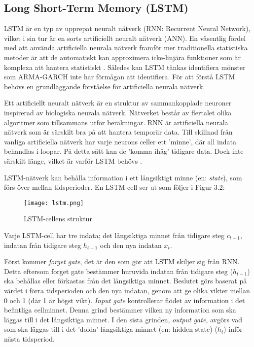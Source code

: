 \documentclass[11pt]{article}
\numberwithin{equation}{section}
\numberwithin{table}{section}
\numberwithin{figure}{section}
\begin{document}
\subsection{Long Short-Term Memory (LSTM)}
LSTM är en typ av upprepat neuralt nätverk (RNN: Recurrent Neural Network), vilket i sin tur är en sorts artificiellt neuralt nätverk (ANN). En väsentlig fördel med att använda artificiella neurala nätverk framför mer traditionella statistiska metoder är att de automatiskt kan approximera icke-linjära funktioner som är komplexa att hantera statistiskt \parencite{paliwal2009neural}. Således kan LSTM tänkas identifiera mönster som ARMA-GARCH inte har förmågan att identifiera.  För att förstå LSTM behövs en grundläggande förståelse för artificiella neurala nätverk. 

Ett artificiellt neuralt nätverk är en struktur av sammankopplade neuroner inspirerad av biologiska neurala nätverk. Nätverket består av flertalet olika algoritmer som tillsammans utför beräkningar. RNN är artificiella neurala nätverk som är särskilt bra på att hantera temporär data. Till skillnad från vanliga artificiella nätverk har varje neurons celler ett 'minne', där all indata behandlas i loopar. På detta sätt kan de 'komma ihåg' tidigare data. Dock inte särskilt länge, vilket är varför LSTM behövs \parencite[][,s.478-559]{purkait2019hands}. 

LSTM-nätverk kan behålla information i ett långsiktigt minne (en: \textit{state}), som förs över mellan tidsperioder. En LSTM-cell ser ut som följer i Figur 3.2:
\begin{figure}[H]
\caption{LSTM-cellens struktur \parencite[lånad från][]{yuan2019nonlinear}}
\texttt{[image: lstm.png]}
\centering
\end{figure}

Varje LSTM-cell har tre indata; det långsiktiga minnet från tidigare steg \(c_{t-1}\), indatan från tidigare steg \(h_{t-1}\) och den nya indatan \(x_{t}\).

Först kommer \textit{forget gate}, det är den som gör att LSTM skiljer sig från RNN. Detta eftersom forget gate bestämmer huruvida indatan från tidigare steg (\(h_{t-1}\)) ska behållas eller förkastas från det långsiktiga minnet. Beslutet görs baserat på värdet i förra tidsperioden och den nya indatan, genom att ge olika vikter mellan 0 och 1 (där 1 är högst vikt). \textit{Input gate} kontrollerar flödet av information i det befintliga cellminnet. Denna grind bestämmer vilken ny information som ska läggas till i det långsiktiga minnet. I den sista grinden, \textit{output gate}, avgörs vad som ska läggas till i det 'dolda' långsiktiga minnet (en: hidden state) (\(h_{t}\)) inför nästa tidsperiod.
\end{document}

